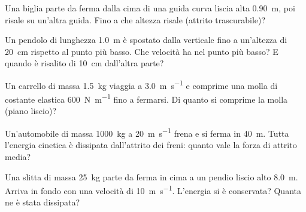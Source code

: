 \begin{esercizio}
Una biglia parte da ferma dalla cima di una guida curva liscia alta \SI{0,90}{\metre}, poi risale su un'altra guida. Fino a che altezza risale (attrito trascurabile)?\\
\end{esercizio}

\begin{esercizio}
Un pendolo di lunghezza \SI{1,0}{\metre} è spostato dalla verticale fino a un'altezza di \SI{20}{\centi\metre} rispetto al punto più basso. Che velocità ha nel punto più basso? E quando è risalito di \SI{10}{\centi\metre} dall'altra parte?\\
\end{esercizio}

\begin{esercizio}
Un carrello di massa \SI{1,5}{\kilo\gram} viaggia a \SI{3,0}{\metre\per\second} e comprime una molla di costante elastica \SI{600}{\newton\per\metre} fino a fermarsi. Di quanto si comprime la molla (piano liscio)?\\
\end{esercizio}

\begin{esercizio}
Un'automobile di massa \SI{1000}{\kilo\gram} a \SI{20}{\metre\per\second} frena e si ferma in \SI{40}{\metre}. Tutta l'energia cinetica è dissipata dall'attrito dei freni: quanto vale la forza di attrito media?\\
\end{esercizio}

\begin{esercizio}
Una slitta di massa \SI{25}{\kilo\gram} parte da ferma in cima a un pendio liscio alto \SI{8,0}{\metre}. Arriva in fondo con una velocità di \SI{10}{\metre\per\second}. L'energia si è conservata? Quanta ne è stata dissipata?\\
\end{esercizio}

